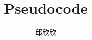 \documentclass[12pt]{article}
\begin{document}
\title{\vspace{-2em}Pseudocode\vspace{-0.7em}}
\author{邱欣欣}
\maketitle\thispagestyle{fancy}
\end{document}
